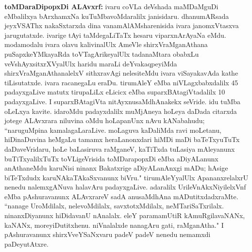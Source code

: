 {\large\textbf{toMDaraDipopxDi ALAvxrf:}} ivaru coVLa deVshada maMDaMguDi eMbalilxya bArxhamxNa kuTuMbavoMdaralilx janisidaru. dhanumARsada jeyxVSAThx nakaSxtarxda dina vanamAlAMsharenisida ivara janomxVtasxva jarugutatxde. ivarige tAyi taMdegaLiTaTx hesaru viparxnArAyaNa eMdu. modamodalu ivara olavu kalivinalUlx AmeVle shirxVraMganAthana puSapxkeYMkayaRda toVTagArikeyalUlx tadanaMtara obabxLu veVshAyxsitxrXVyalUlx haridu maraLi deYvakaqpeyiMda shirxVraMganAthanalelxV sithxravAgi nelesiteMdu ivara viSayakavAda kathe tiLisutatxde. ivara racanegaLu eraDu. tirumAleY eMba niVLagxbabxdalilx 45 padayxgaLive matutx tirupaLiLx eLicicx eMba suparxBAtagiVtadalilx 10 padayxgaLive. I suparxBAtagiVta nitAyxnusaMdhAnakekx seVride. idu tuMba oLeLxya kavite. idaroMdu padayxdalilx muMjAneya hoLeya daDada citarxda jotege ALAvxrara niluvina oMdu hoLapanUnx nAvu kANabahudu; ``naruguMpina kamalagaLaraLive. moLaguva kaDaliMda ravi moLetanu, hiDinaDuvina heMgaLu tamamx heraLanonxdari hiMDi maDi baTeTxyuTuTx daDaveVridaru, hoLe baLasiruva raMganeV, kaTiTxda tuLasiya mAleyanunx buTiTxyalilxTuTx toVLigeVrisida toMDarapopxDi eMba aDiyALanunx anAthaneMdu karuNisi ninanx Bakatxrige aDiyALanAnxgi mADu; hAsige biTeTxdudx karuNAkaTAkaSxvanunx biVru." tirumAleYyalUlx ApananxrelalxrU nenedu nalemxgANuva halavAru padayxgaLive. adaralilx UrileVnAkxNiyilelxVnf eMba pAshuravanunx ALAvxrareV sadA anusaMdhAna mADutitxdadxraMte. ``nanage UroMdilalx, nelevoMdilalx, savxtotxMdilalx, neMTariSaTxrilalx. ninanxDiyanunx hiDidavanU nAnalalx. eleY paramamUtiR kAmuRgilavaNANx, kaNANx, moreyiDutitxhenu. niVnalalxde nanagAru gati, raMganAtha." I pAshuravanunx shirxVveYSaNxvaru padeV padeV nenedu nemamxdi paDeyutAtxre.

